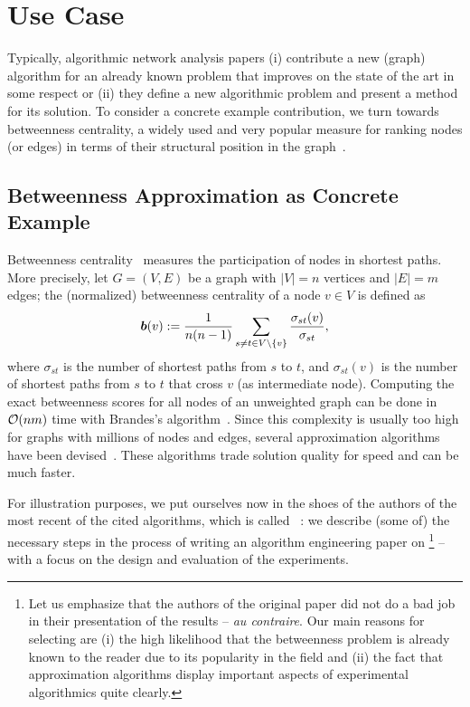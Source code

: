 \documentclass[algorithms,article,submit,moreauthors,pdftex]{Definitions/mdpi}
\newcommand{\changed}[1]{#1}
\newcommand{\removed}[1]{}
\begin{document}
\section{Use Case}
\label{sec:target-use-cases}
%
Typically, algorithmic network analysis papers (i) contribute
a new (graph) algorithm for an already known problem that improves on the
state of the art in some respect or
(ii) they define a new algorithmic problem and present a method for its solution.
%
To consider a concrete example contribution, we turn towards {betweenness centrality},
a widely used and very popular measure for ranking nodes (or edges) in terms of their structural position in
the graph~\cite{boldi2014axioms}.
%
\subsection{Betweenness Approximation as Concrete Example}
\label{sub:concrete-example}
%
Betweenness centrality~\cite{freeman1977set} measures the participation of nodes in
shortest paths. More precisely, let $G = (V,E)$ be a graph \changed{with $|V|=n$ vertices and $|E|=m$ edges}; the (normalized) betweenness centrality of a node $v \in V$ is defined as
%
\begin{equation}
\label{eq:betweenness_def}
  \mathbc(v) := \frac{1}{n (n-1)} \sum_{\changed{s \neq t \in V \setminus \{v\}}}{\frac{\sigma_{st}(v)}{\sigma_{st}}},
\end{equation}
%
where $\sigma_{st}$ is the number of shortest paths from $s$ to $t$, and $\sigma_{st}(v)$ is the number of shortest paths from $s$ to $t$ that cross $v$ (as intermediate node).
%
Computing the exact betweenness scores for all nodes of an unweighted graph can be done in ${\mathcal{O}}(nm)$ time
with Brandes's algorithm~\cite{brandes2001faster}.\removed{, where $n$ is the number of nodes and $m$ the number of edges in $G$.}
Since this complexity is usually too high for graphs with millions of nodes and edges,
several approximation algorithms have been
devised~\cite{bader2007approximating,geisberger08,riondato2016fast,riondato2018abra,borassi2016kadabra}.
These algorithms trade solution quality for speed and can be much faster.

For illustration purposes, we put ourselves now in the
shoes of the authors of the most recent of the cited algorithms, which is called \kad~\cite{borassi2016kadabra}:
we describe (some of) the necessary steps in the process of writing an algorithm engineering
paper on \kad\footnote{\changed{Let us emphasize that the authors of the original \kad paper did not do a bad job in
their presentation of the results} -- \textit{au contraire}.
Our main reasons \changed{for selecting \kad} are (i) the high likelihood that the betweenness problem
is already known to the reader due to its popularity in the field and (ii) the fact that approximation
algorithms display important aspects of experimental algorithmics quite clearly.} --
%
with a focus on the design and evaluation of the experiments.
\end{document}
